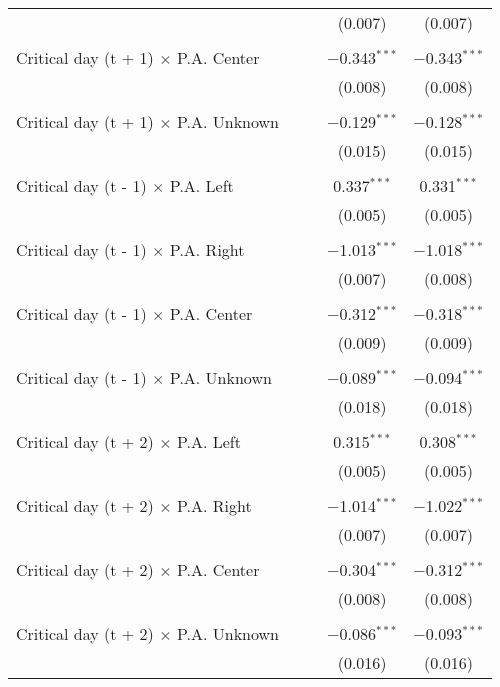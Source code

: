 \documentclass[
]{article}
\begin{document}
\begin{table}[!htbp]
{\begin{tabular}{@{\extracolsep{5pt}}lcccc}
  &  &  & (0.007) & (0.007) \\ 
  & & & & \\ 
 Critical day (t + 1) $\times$ P.A. Center &  &  & $-$0.343$^{***}$ & $-$0.343$^{***}$ \\ 
  &  &  & (0.008) & (0.008) \\ 
  & & & & \\ 
 Critical day (t + 1) $\times$ P.A. Unknown &  &  & $-$0.129$^{***}$ & $-$0.128$^{***}$ \\ 
  &  &  & (0.015) & (0.015) \\ 
  & & & & \\ 
 Critical day (t - 1) $\times$ P.A. Left &  &  & 0.337$^{***}$ & 0.331$^{***}$ \\ 
  &  &  & (0.005) & (0.005) \\ 
  & & & & \\ 
 Critical day (t - 1) $\times$ P.A. Right &  &  & $-$1.013$^{***}$ & $-$1.018$^{***}$ \\ 
  &  &  & (0.007) & (0.008) \\ 
  & & & & \\ 
 Critical day (t - 1) $\times$ P.A. Center &  &  & $-$0.312$^{***}$ & $-$0.318$^{***}$ \\ 
  &  &  & (0.009) & (0.009) \\ 
  & & & & \\ 
 Critical day (t - 1) $\times$ P.A. Unknown &  &  & $-$0.089$^{***}$ & $-$0.094$^{***}$ \\ 
  &  &  & (0.018) & (0.018) \\ 
  & & & & \\ 
 Critical day (t + 2) $\times$ P.A. Left &  &  & 0.315$^{***}$ & 0.308$^{***}$ \\ 
  &  &  & (0.005) & (0.005) \\ 
  & & & & \\ 
 Critical day (t + 2) $\times$ P.A. Right &  &  & $-$1.014$^{***}$ & $-$1.022$^{***}$ \\ 
  &  &  & (0.007) & (0.007) \\ 
  & & & & \\ 
 Critical day (t + 2) $\times$ P.A. Center &  &  & $-$0.304$^{***}$ & $-$0.312$^{***}$ \\ 
  &  &  & (0.008) & (0.008) \\ 
  & & & & \\ 
 Critical day (t + 2) $\times$ P.A. Unknown &  &  & $-$0.086$^{***}$ & $-$0.093$^{***}$ \\ 
  &  &  & (0.016) & (0.016) \\ 

\end{tabular}}
\end{table}
\end{document}

